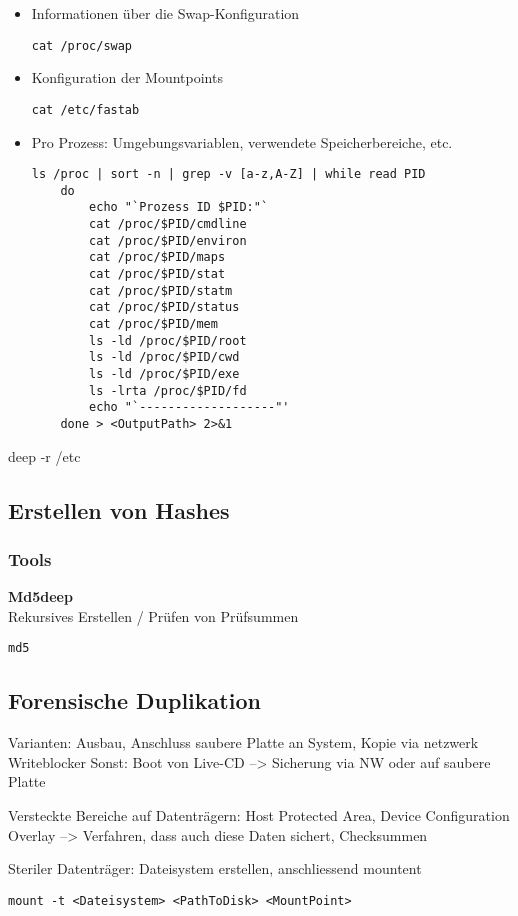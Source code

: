 \begin{itemize}
\item  Informationen über die Swap-Konfiguration
\begin{verbatim}
cat /proc/swap
\end{verbatim}

\item  Konfiguration der Mountpoints
\begin{verbatim}
cat /etc/fastab
\end{verbatim}

\item  Pro Prozess: Umgebungsvariablen, verwendete Speicherbereiche, etc.
\begin{verbatim}
ls /proc | sort -n | grep -v [a-z,A-Z] | while read PID
	do
		echo "`Prozess ID $PID:"`
		cat /proc/$PID/cmdline
		cat /proc/$PID/environ
		cat /proc/$PID/maps
		cat /proc/$PID/stat
		cat /proc/$PID/statm
		cat /proc/$PID/status
		cat /proc/$PID/mem
		ls -ld /proc/$PID/root
		ls -ld /proc/$PID/cwd
		ls -ld /proc/$PID/exe
		ls -lrta /proc/$PID/fd
		echo "`-------------------"'
	done > <OutputPath> 2>&1
\end{verbatim}

\end{itemize}
deep -r /etc

\subsection{Erstellen von Hashes}

\subsubsection{Tools}
\textbf{Md5deep}\\
Rekursives Erstellen / Prüfen von Prüfsummen
\begin{verbatim}
md5
\end{verbatim}

\subsection{Forensische Duplikation}
Varianten: Ausbau, Anschluss saubere Platte an System, Kopie via netzwerk
Writeblocker
Sonst: Boot von Live-CD --> Sicherung via NW oder auf saubere Platte


Versteckte Bereiche auf Datenträgern: Host Protected Area, Device Configuration Overlay --> Verfahren, dass auch diese Daten sichert, Checksummen


Steriler Datenträger: Dateisystem erstellen, anschliessend mountent
\begin{verbatim}
mount -t <Dateisystem> <PathToDisk> <MountPoint>
\end{verbatim}

